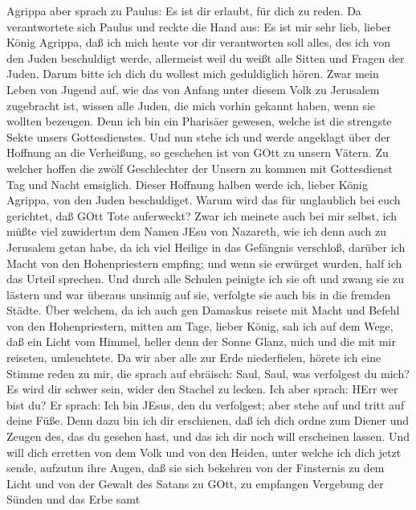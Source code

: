  Agrippa aber sprach zu Paulus: Es ist dir erlaubt, für dich
zu reden. Da verantwortete sich Paulus und reckte die Hand aus:
 Es ist mir sehr lieb, lieber König Agrippa, daß ich mich
heute vor dir verantworten soll alles, des ich von den Juden beschuldigt
werde,  allermeist weil du weißt alle Sitten und Fragen der
Juden. Darum bitte ich dich du wollest mich geduldiglich hören.
 Zwar mein Leben von Jugend auf, wie das von Anfang unter
diesem Volk zu Jerusalem zugebracht ist, wissen alle Juden, 
die mich vorhin gekannt haben, wenn sie wollten bezeugen. Denn ich bin
ein Pharisäer gewesen, welche ist die strengste Sekte unsers
Gottesdienstes.  Und nun stehe ich und werde angeklagt über
der Hoffnung an die Verheißung, so geschehen ist von GOtt zu unsern
Vätern.  Zu welcher hoffen die zwölf Geschlechter der Unsern
zu kommen mit Gottesdienst Tag und Nacht emsiglich. Dieser Hoffnung
halben werde ich, lieber König Agrippa, von den Juden beschuldiget.
 Warum wird das für unglaublich bei euch gerichtet, daß GOtt
Tote auferweckt?  Zwar ich meinete auch bei mir selbst, ich
müßte viel zuwidertun dem Namen JEsu von Nazareth,  wie ich
denn auch zu Jerusalem getan habe, da ich viel Heilige in das Gefängnis
verschloß, darüber ich Macht von den Hohenpriestern empfing; und wenn
sie erwürget wurden, half ich das Urteil sprechen.  Und
durch alle Schulen peinigte ich sie oft und zwang sie zu lästern und war
überaus unsinnig auf sie, verfolgte sie auch bis in die fremden Städte.
 Über welchem, da ich auch gen Damaskus reisete mit Macht
und Befehl von den Hohenpriestern,  mitten am Tage, lieber
König, sah ich auf dem Wege, daß ein Licht vom Himmel, heller denn der
Sonne Glanz, mich und die mit mir reiseten, umleuchtete. 
Da wir aber alle zur Erde niederfielen, hörete ich eine Stimme reden zu
mir, die sprach auf ebräisch: Saul, Saul, was verfolgest du mich? Es
wird dir schwer sein, wider den Stachel zu lecken.  Ich
aber sprach: HErr wer bist du? Er sprach: Ich bin JEsus, den du
verfolgest; aber stehe auf und tritt auf deine Füße.  Denn
dazu bin ich dir erschienen, daß ich dich ordne zum Diener und Zeugen
des, das du gesehen hast, und das ich dir noch will erscheinen lassen.
 Und will dich erretten von dem Volk und von den Heiden,
unter welche ich dich jetzt sende,  aufzutun ihre Augen,
daß sie sich bekehren von der Finsternis zu dem Licht und von der Gewalt
des Satans zu GOtt, zu empfangen Vergebung der Sünden und das Erbe samt
